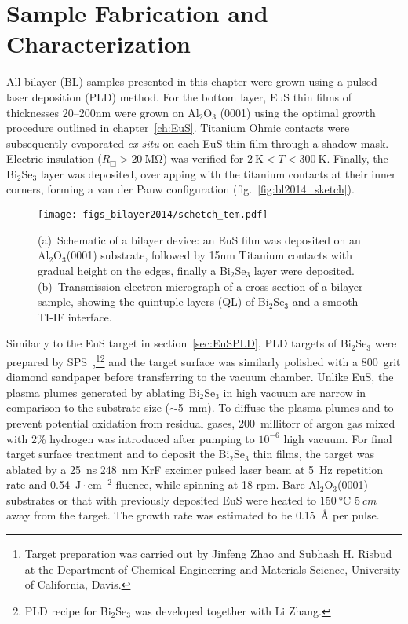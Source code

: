 \section{Sample Fabrication and Characterization}\label{sec:bilayer2014_char}
All bilayer (BL) samples presented in this chapter were grown using a pulsed laser deposition (PLD) method. For the bottom layer, EuS thin films of thicknesses 20--200nm were grown on Al$_2$O$_3$ (0001) using the optimal growth procedure outlined in chapter~\ref{ch:EuS}. Titanium Ohmic contacts were subsequently evaporated {\it ex situ} on each EuS thin film through a shadow mask. Electric insulation ($R_\Box > 20~\mathrm{M\Omega}$) was verified for $2~\mathrm{K}<T<300~\mathrm{K}$. Finally, the Bi$_2$Se$_3$ layer was deposited, overlapping with the titanium contacts at their inner corners, forming a van der Pauw configuration (fig.~\ref{fig:bl2014_sketch}).%
%
\begin{figure}[h]%
\centering%
\subfloat{\label{fig:bl2014_sketch}}%
\subfloat{\label{fig:bl2014_TEM}}%
\texttt{[image: figs\_bilayer2014/schetch\_tem.pdf]}%
\caption[Schematic and cross-section TEM of Bi$_2$Se$_3$ / EuS thin film bilayers]{(a)~Schematic of a bilayer device: an EuS film was deposited on an Al$_2$O$_3$(0001) substrate, followed by 15nm Titanium contacts with gradual height on the edges, finally a Bi$_2$Se$_3$ layer were deposited. (b)~Transmission electron micrograph of a cross-section of a bilayer sample, showing the quintuple layers (QL) of Bi$_2$Se$_3$ and a smooth TI-IF interface.}%
\end{figure}%

Similarly to the EuS target in section~\ref{sec:EuSPLD}, PLD targets of Bi$_2$Se$_3$ were prepared by SPS~\cite{Jinfeng2, Subhash1},\footnote{Target preparation was carried out by Jinfeng Zhao and Subhash H. Risbud at the Department of Chemical Engineering and Materials Science, University of California, Davis.}\footnote{PLD recipe for Bi$_2$Se$_3$ was developed together with Li Zhang.} and the target surface was similarly polished with a 800~grit diamond sandpaper before transferring to the vacuum chamber. Unlike EuS, the plasma plumes generated by ablating Bi$_2$Se$_3$ in high vacuum are narrow in comparison to the substrate size ($\sim$5~mm). To diffuse the plasma plumes and to prevent potential oxidation from residual gases, 200~millitorr of argon gas mixed with 2\% hydrogen was introduced after pumping to $10^{-6}$ high vacuum. For final target surface treatment and to deposit the Bi$_2$Se$_3$ thin films, the target was ablated by a 25~ns 248~nm KrF excimer pulsed laser beam at 5~Hz repetition rate and 0.54~$\mathrm{J\cdot{}cm^{-2}}$ fluence, while spinning at 18 rpm. Bare Al$_2$O$_3$(0001) substrates or that with previously deposited EuS were heated to $\SI{150}{\degreeCelsius}$ $\SI{5}{cm}$ away from the target. The growth rate was estimated to be 0.15~\AA{} per pulse.

